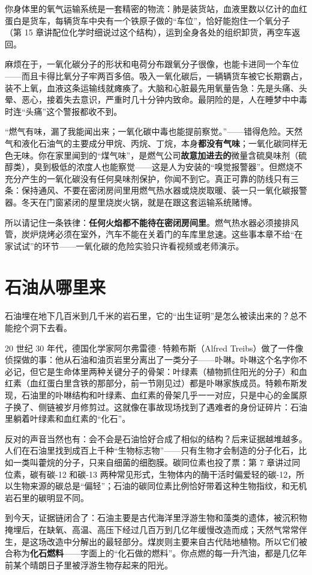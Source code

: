 你身体里的氧气运输系统是一套精密的物流：肺是装货站，血液里数以亿计的血红蛋白是货车，每辆货车中央有一个铁原子做的“车位”，恰好能抱住一个氧分子 （第 15 章讲配位化学时细说过这个结构），运到全身各处的组织卸货，再空车返回。

麻烦在于，一氧化碳分子的形状和电荷分布跟氧分子很像，也能卡进同一个车位——而且卡得比氧分子牢两百多倍。吸入一氧化碳后，一辆辆货车被它长期霸占，装不上氧，血液这条运输线就瘫痪了。大脑和心脏最先用氧量告急：先是头痛、头晕、恶心，接着失去意识，严重时几十分钟内致命。最阴险的是，人在睡梦中中毒时连“头痛”这个警报都收不到。

\begin{wuqu}
“燃气有味，漏了我能闻出来；一氧化碳中毒也能提前察觉。”——错得危险。天然气和液化石油气的主要成分甲烷、丙烷、丁烷，本身\textbf{都没有气味}；一氧化碳同样无色无味。你在家里闻到的“煤气味”，是燃气公司\textbf{故意加进去的}微量含硫臭味剂（硫醇类），臭到极低的浓度人也能察觉——这是人为安装的“嗅觉报警器”。但燃烧不充分产生的一氧化碳没有任何臭味剂保护，你闻不到它。真正可靠的防线只有三条：保持通风、不要在密闭房间里用燃气热水器或烧炭取暖、装一只一氧化碳报警器。冬天在门窗紧闭的屋里烧炭火锅，就是在跟这套运输系统赌博。
\end{wuqu}

所以请记住一条铁律：\textbf{任何火焰都不能待在密闭房间里}。燃气热水器必须接排风管，炭炉烧烤必须在室外，汽车不能在关着门的车库里怠速。这些事本章不给“在家试试”的环节——一氧化碳的危险实验只许看视频或老师演示。

\section{石油从哪里来}

\begin{zhengju}
石油埋在地下几百米到几千米的岩石里，它的“出生证明”是怎么被读出来的？总不能挖个洞下去看。

20 世纪 30 年代，德国化学家阿尔弗雷德·特赖布斯（Alfred Treibs）做了一件像侦探做的事：他从石油和油页岩里分离出了一类分子——卟啉。卟啉这个名字你不必记，但它是生命体里两种关键分子的骨架：叶绿素（植物抓住阳光的分子）和血红素（血红蛋白里含铁的那部分，前一节刚见过）都是卟啉家族成员。特赖布斯发现，石油里的卟啉结构和叶绿素、血红素的骨架几乎一一对应，只是中心的金属原子换了、侧链被岁月修剪过。这就像在事故现场找到了遇难者的身份证碎片：石油里躺着叶绿素和血红素的“化石”。

反对的声音当然也有：会不会是石油恰好合成了相似的结构？后来证据越堆越多。人们在石油里找到成百上千种“生物标志物”——只有生物才会制造的分子化石，比如一类叫藿烷的分子，只来自细菌的细胞膜。碳同位素也投了票：第 7 章讲过同位素，碳有碳-12 和碳-13 两种常见形式，生物体内的酶干活时偏爱轻的碳-12，所以生物来源的碳总是“偏轻”；石油的碳同位素比例恰好带着这种生物指纹，和无机岩石里的碳明显不同。

到今天，证据链闭合了：石油主要是古代海洋里浮游生物和藻类的遗体，被沉积物掩埋后，在缺氧、高温、高压下经过几百万到几亿年缓慢改造而成；天然气常常伴生，是这场改造中分解出的最轻部分。煤炭则主要来自古代陆地植物。所以它们被合称为\textbf{化石燃料}——字面上的“化石做的燃料”。你点燃的每一升汽油，都是几亿年前某个晴朗日子里被浮游生物存起来的阳光。
\end{zhengju}

